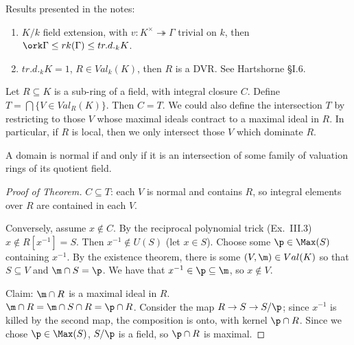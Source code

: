  Results presented in the notes:
 \begin{enumerate}
   \item $K/k$ field extension, with $v:K^\times\twoheadrightarrow \Gamma$ trivial on
   $k$, then $\ork \Gamma \le rk(\Gamma) \le tr.d._k K$.

   \item $tr.d._k K=1$, $R\in Val_k(K)$, then $R$ is a DVR. See Hartshorne \S I.6.
 \end{enumerate}

 \begin{theorem}
   Let $R\subseteq K$ is a sub-ring of a field, with integral closure $C$. Define
   $T=\bigcap \{V\in Val_R(K)\}$. Then $C=T$. We could also define the intersection $T$
   by restricting to those $V$ whose maximal ideals contract to a maximal ideal in $R$.
   In particular, if $R$ is local, then we only intersect those $V$ which dominate $R$.
 \end{theorem}
 \begin{corollary}
   A domain is normal if and only if it is an intersection of some family of valuation
   rings of its quotient field.
 \end{corollary}
 \begin{proof}[Proof of Theorem]
   $C\subseteq T$: each $V$ is normal and contains $R$, so integral elements over
   $R$ are contained in each $V$.

   Conversely, assume $x\not\in C$. By the reciprocal polynomial trick (Ex.~III.3)
   $x\not\in R[x^{-1}]=S$. Then $x^{-1}\notin U(S)$ (let $x\in S$). Choose some $\p\in
   \Max(S)$ containing $x^{-1}$. By the existence theorem, there is some $(V,\m)\in
   Val(K)$ so that $S\subseteq V$ and $\m\cap S=\p$. We have that $x^{-1}\in \p\subseteq
   \m$, so $x\not\in V$.

   Claim: $\m\cap R$ is a maximal ideal in $R$.\\
   $\m\cap R = \m\cap S\cap R = \p\cap R$. Consider the map $R\to S\to S/\p$; since
   $x^{-1}$ is killed by the second map, the composition is onto, with kernel $\p\cap R$.
   Since we chose $\p\in \Max (S)$, $S/\p$ is a field, so $\p\cap R$ is maximal.
 \end{proof}

